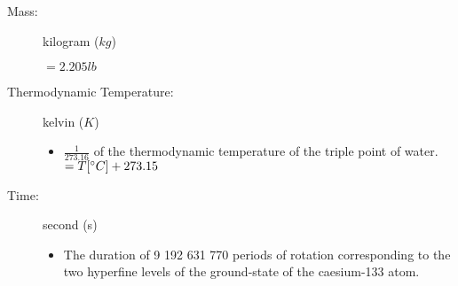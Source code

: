 \begin{description}
\item[Mass:] kilogram ($kg$)
\begin{itemize}
\items $= 2.205 lb$
\end{itemize}				

\item[Thermodynamic Temperature:] kelvin ($K$)
\begin{itemize}
\item $\frac{1}{273.16}$ of the thermodynamic temperature of the triple point of water.
\items $= T [^{\circ} C] + 273.15$
\end{itemize}

\item[Time:] second (s)
\begin{itemize}
\item The duration of 9 192 631 770 periods of rotation corresponding to the two hyperfine levels of the ground-state of the caesium-133 atom.
\end{itemize}				
\end{description}	


